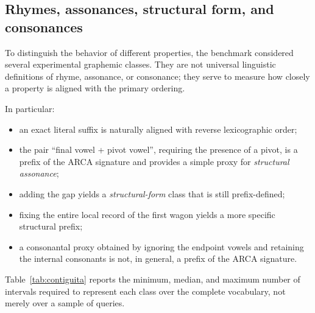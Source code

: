 \documentclass[11pt,a4paper]{article}
\theoremstyle{definition}
\theoremstyle{remark}
\begin{document}
\subsection{Rhymes, assonances, structural form, and consonances}

To distinguish the behavior of different properties, the benchmark considered several experimental graphemic classes. They are not universal linguistic definitions of rhyme, assonance, or consonance; they serve to measure how closely a property is aligned with the primary ordering.

In particular:
\begin{itemize}
  \item an exact literal suffix is naturally aligned with reverse lexicographic order;
  \item the pair ``final vowel + pivot vowel'', requiring the presence of a pivot, is a prefix of the ARCA signature and provides a simple proxy for \emph{structural assonance};
  \item adding the gap yields a \emph{structural-form} class that is still prefix-defined;
  \item fixing the entire local record of the first wagon yields a more specific structural prefix;
  \item a consonantal proxy obtained by ignoring the endpoint vowels and retaining the internal consonants is not, in general, a prefix of the ARCA signature.
\end{itemize}

Table~\ref{tab:contiguita} reports the minimum, median, and maximum number of intervals required to represent each class over the complete vocabulary, not merely over a sample of queries.

\begin{table}[htbp]
\centering
\caption{Contiguity of experimental classes under the three orderings. Triples report minimum/median/maximum number of intervals per class.}
\label{tab:contiguita}
\end{table}
\end{document}
